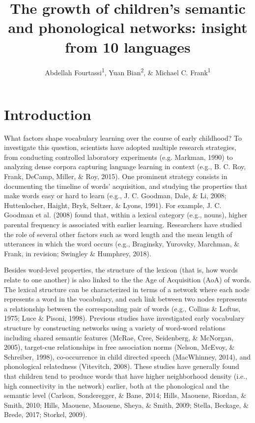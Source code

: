 \documentclass[english,floatsintext,man]{apa6}
\title{The growth of children's semantic and phonological networks: insight
from 10 languages}
\author{Abdellah Fourtassi\textsuperscript{1}, Yuan Bian\textsuperscript{2}, \& Michael C. Frank\textsuperscript{1}}
\affiliation{
    \vspace{0.5cm}
          \textsuperscript{1} Department of Psychology, Stanford University\\
          \textsuperscript{2} Department of Psychology, University of Illinois  }
\theoremstyle{definition}
\theoremstyle{definition}
\theoremstyle{definition}
\theoremstyle{remark}
\begin{document}
\maketitle

\setcounter{secnumdepth}{0}



\section{Introduction}\label{introduction}

What factors shape vocabulary learning over the course of early
childhood? To investigate this question, scientists have adopted
multiple research strategies, from conducting controlled laboratory
experiments (e.g. Markman, 1990) to analyzing dense corpora capturing
language learning in context (e.g., B. C. Roy, Frank, DeCamp, Miller, \&
Roy, 2015). One prominent strategy consists in documenting the timeline
of words' acquisition, and studying the properties that make words easy
or hard to learn (e.g., J. C. Goodman, Dale, \& Li, 2008; Huttenlocher,
Haight, Bryk, Seltzer, \& Lyons, 1991). For example, J. C. Goodman et
al. (2008) found that, within a lexical category (e.g., nouns), higher
parental frequency is associated with earlier learning. Researchers have
studied the role of several other factors such as word length and the
mean length of utterances in which the word occurs (e.g., Braginsky,
Yurovsky, Marchman, \& Frank, in revision; Swingley \& Humphrey, 2018).

Besides word-level properties, the structure of the lexicon (that is,
how words relate to one another) is also linked to the the Age of
Acquisition (AoA) of words. The lexical structure can be characterized
in terms of a network where each node represents a word in the
vocabulary, and each link between two nodes represents a relationship
between the corresponding pair of words (e.g., Collins \& Loftus, 1975;
Luce \& Pisoni, 1998). Previous studies have investigated early
vocabulary structure by constructing networks using a variety of
word-word relations including shared semantic features (McRae, Cree,
Seidenberg, \& McNorgan, 2005), target-cue relationships in free
association norms (Nelson, McEvoy, \& Schreiber, 1998), co-occurrence in
child directed speech (MacWhinney, 2014), and phonological relatedness
(Vitevitch, 2008). These studies have generally found that children tend
to produce words that have higher neighborhood density (i.e., high
connectivity in the network) earlier, both at the phonological and the
semantic level (Carlson, Sonderegger, \& Bane, 2014; Hills, Maouene,
Riordan, \& Smith, 2010; Hills, Maouene, Maouene, Sheya, \& Smith, 2009;
Stella, Beckage, \& Brede, 2017; Storkel, 2009).
\end{document}
